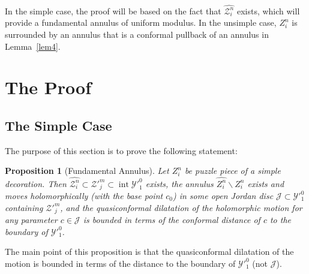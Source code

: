 \documentclass[12pt,a4paper]{amsart}
\newtheorem{proposition}[theorem]{Proposition}
\newcommand{\JJ}{\mathcal J}
\newcommand{\YYp}{{\mathcal Y'}}
\newcommand{\YY}{\mathcal Y}
\newcommand{\ZZ}{\mathcal Z}
\newcommand{\intr}{\operatorname{int}}
\begin{document}
In the simple case, the proof will be based on the fact that
$\widehat{\ZZ^n_i}$ exists, which will provide a fundamental annulus
of uniform modulus. In the unsimple case, $Z^n_i$ is surrounded by
an annulus that is a conformal pullback of an annulus in
Lemma~\ref{lem4}.



\section{The Proof}

  \subsection{The Simple Case}

\label{sec2.3}

 The purpose of this
  section is to prove the following statement:


\begin{proposition}[Fundamental Annulus]
\label{prop2} Let $Z^n_i$ be puzzle piece of a simple decoration.
Then $\widehat{\ZZ^n_i}\subset \ZZ'^m_j\subset\intr \YYp^0_1$
exists, the annulus $\widehat{Z^n_i}\backslash Z^n_i$ exists and
moves holomorphically (with the base point $c_0$) in some open
Jordan disc $\JJ\subset \YY'^0_1$ containing $\ZZ'^m_j$, and the
quasiconformal
  dilatation of the holomorphic motion for any parameter $c\in \JJ$ is bounded in
  terms of the conformal distance of $c$ to the boundary of $\YY'^0_1$.
  \end{proposition}


  The main point of this proposition is that the quasiconformal
  dilatation of the motion is bounded in terms of the distance
  to the boundary of $\YY'^0_1$ (not $\JJ$).
\end{document}
